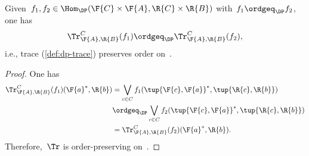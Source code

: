 \begin{lemma}
    Given~$f_1,f_2\in \Hom_\DP(\F{C}\times \F{A},\R{C}\times \R{B})$ with~$f_1\ordgeq_\DP f_2$, one has
    \begin{equation}
        \Tr_{\F{A},\R{B}}^C(f_1)\ordgeq_\DP \Tr_{\F{A},\R{B}}^C(f_2),
    \end{equation}
    i.e., trace (\cref{def:dp-trace}) preserves order on~\DP.
\end{lemma}

\begin{proof}
    One has
    \begin{equation}
        \begin{aligned}
            \Tr_{\F{A},\R{B}}^C(f_1)(\F{a}^*,\R{b})&=\bigvee_{c\in C}f_1(\tup{\F{c},\F{a}}^*,\tup{\R{c},\R{b}})\\
            &\ordgeq_\DP \bigvee_{c\in C}f_2(\tup{\F{c},\F{a}}^*,\tup{\R{c},\R{b}})\\
            &=\Tr_{\F{A},\R{B}}^C(f_2)(\F{a}^*,\R{b}).
        \end{aligned}
    \end{equation}
    Therefore,~$\Tr$ is order-preserving on~\DP.
\end{proof}
